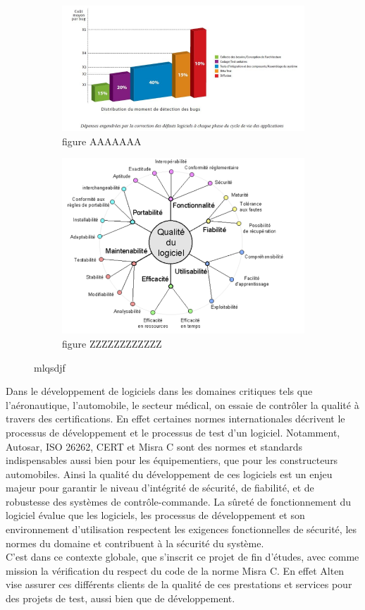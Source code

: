 \begin{figure} [H]
	\begin{subfigure}{.5\textwidth}
		\centering
		\includegraphics[scale=0.45]{images/cap_1}
		\caption{figure AAAAAAA}
	\end{subfigure}
	\begin{subfigure}{.5\textwidth}
		\centering
		\includegraphics[scale=0.45]{images/cap_2}
		\caption{figure ZZZZZZZZZZZZ}
	\end{subfigure}
	\caption{mlqsdjf}
\end{figure}
Dans le développement de logiciels dans les domaines critiques tels que l’aéronautique, l’automobile, le secteur médical, on essaie de contrôler la qualité à travers des certifications. En effet certaines normes internationales décrivent le processus de développement et le processus de test d’un logiciel. Notamment, Autosar, ISO 26262, CERT et Misra C sont des normes et standards indispensables aussi bien pour les équipementiers, que pour les constructeurs automobiles. Ainsi la qualité du développement de ces logiciels est un enjeu majeur pour garantir le niveau d’intégrité de sécurité, de fiabilité, et de robustesse des systèmes de contrôle-commande. La sûreté de fonctionnement du logiciel évalue que les logiciels, les processus de développement et son environnement d’utilisation respectent les exigences fonctionnelles de sécurité, les normes du domaine et contribuent à la sécurité du système.\\
C’est dans ce contexte globale, que s’inscrit ce projet de fin d’études, avec comme mission la vérification du respect du code de la norme Misra C. En effet Alten vise assurer ces différents clients de la qualité de ces prestations et services pour des projets de test, aussi bien que de développement.
